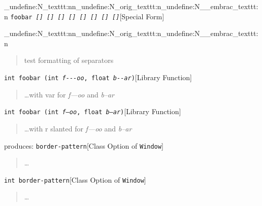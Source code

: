 \documentclass{book}
\begin{document}
\ExplSyntaxOn%
\cs_undefine:N{\embrac_texttt:nn}\cs_undefine:N{\embrac_orig_texttt:n}\cs_undefine:N{\__embrac_texttt:n}%
\ExplSyntaxOff%
%
\noindent\texttt{foobar \EmbracOn{}\textnormal{\textsl{[] \EmbracOff{}\textnormal{[]}\EmbracOn{} \textsl{[]} \texttt{[]} \texttt{[]} \EmbracOff{}\textnormal{\textsl{[]}}\EmbracOn{} \EmbracOff{}\textnormal{\texttt{[]}}\EmbracOn{} \EmbracOff{}\textnormal{\texttt{\textsl{[]}}}\EmbracOn{}}}\EmbracOff{}}\hfill[Special Form]


\ExplSyntaxOn%
\cs_undefine:N{\embrac_texttt:nn}\cs_undefine:N{\embrac_orig_texttt:n}\cs_undefine:N{\__embrac_texttt:n}%
\ExplSyntaxOff%
%
\begin{quote}
\unskip{\parskip=0pt\noindent}%
test formatting of separators
\end{quote}

\noindent\texttt{int foobar (int \textsl{f{-}{-}{-}oo}, float \textsl{b{-}{-}ar})}\hfill[Library Function]



%
\begin{quote}
\unskip{\parskip=0pt\noindent}%
\dots{}\@ with var for \textsl{f---oo} and \textsl{b--ar}
\end{quote}

\noindent\texttt{int foobar (int \textnormal{\textsl{f---oo}}, float \textnormal{\textsl{b--ar}})}\hfill[Library Function]



%
\begin{quote}
\unskip{\parskip=0pt\noindent}%
\dots{}\@ with r slanted for \textsl{f---oo} and \textsl{b--ar}
\end{quote}

\noindent{}produces:
\noindent\texttt{border-pattern}\hfill[Class Option of \texttt{Window}]



%
\begin{quote}
\unskip{\parskip=0pt\noindent}%
\dots{}\@
\end{quote}

\noindent\texttt{\texttt{int} border-pattern}\hfill[Class Option of \texttt{Window}]



%
\begin{quote}
\unskip{\parskip=0pt\noindent}%
\dots{}\@
\end{quote}
\end{document}
